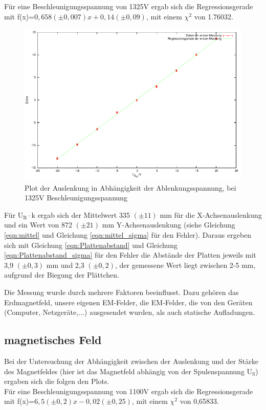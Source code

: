 \documentclass[12pt]{scrartcl}
\begin{document}
\newpage

Für eine Beschleunigungsspannung von 1325V ergab sich die Regressionsgerade mit f(x)=$0,658 (\pm 0,007) x  +0,14 (\pm 0,09)$, mit einem $\chi^2$ von 1.76032.

\begin{figure}[htbp] 
  \centering
    \includegraphics[scale = 1]{y_3.pdf}
  	\caption[Plot der Auslenkung in Abhängigkeit der Ablenkungsspannung, bei 1325V Beschleunigungsspannung]{Plot der Auslenkung in Abhängigkeit der Ablenkungsspannung, bei 1325V Beschleunigungsspannung}
  \label{fig:x_1}
\end{figure}

Für U$_\text{B} \cdot \text{k}$ ergab sich der Mittelwert 335 $(\pm 11)$ mm für die X-Achsenauslenkung und ein Wert von 872	$(\pm 21)$ mm Y-Achsenauslenkung (siehe Gleichung \ref{eqn:mittel} und Gleichung \ref{eqn:mittel_sigma} für den Fehler).
Daraus ergeben sich mit Gleichung \ref{eqn:Plattenabstand} und Gleichung \ref{eqn:Plattenabstand_sigma} für den Fehler die Abstände der Platten jeweils mit 3,9 $(\pm 0,3)$ mm und 2,3	$(\pm 0,2)$, der gemessene Wert liegt zwischen 2-5 mm, aufgrund der Biegung der Plättchen.

Die Messung wurde durch mehrere Faktoren beeinflusst. Dazu gehören das Erdmagnetfeld, unsere eigenen EM-Felder, die EM-Felder, die von den Geräten (Computer, Netzgeräte,...) ausgesendet wurden, als auch statische Aufladungen.
\newpage
\subsection{magnetisches Feld}

Bei der Untersuchung der Abhängigkeit zwischen der Auslenkung und der Stärke des Magnetfeldes (hier ist das Magnetfeld abhängig von der Spulenspannung U$_\text{S}$) ergaben sich die folgen den Plots.\\
Für eine Beschleunigungsspannung von 1100V ergab sich die Regressionsgerade mit f(x)=$6,5 (\pm 0,2) x  - 0,02 (\pm 0,25)$, mit einem $\chi^2$ von 0,65833.
\end{document}
